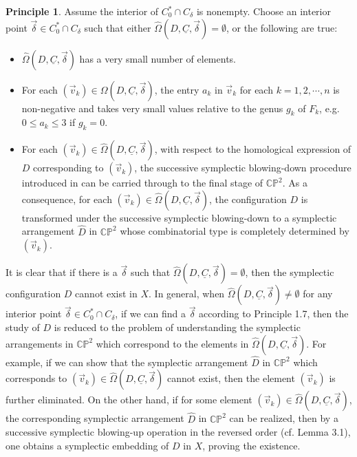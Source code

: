 \documentclass[11pt]{amsart}
\theoremstyle{plain}
\numberwithin{theorem}{section}
\theoremstyle{definition}
\newtheorem{principle}[theorem]{Principle}
\newcommand{\C}{{\mathbb C}}
\renewcommand{\P}{{\mathbb P}}
\begin{document}
\begin{principle}
Assume the interior of $C^\ast_0 \cap C_\delta$ is nonempty. Choose an interior point 
$\vec{\delta}\in C^\ast_0 \cap C_\delta$ such that either $\hat{\Omega}(D,\underline{C},\vec{\delta})=\emptyset$, 
or the following are true:
\begin{itemize}
\item [{(i)}] $\hat{\Omega}(D,\underline{C},\vec{\delta})$ has a very small number of elements.
\item [{(ii)}] For each $(\vec{v}_k)\in\Omega(D,\underline{C},\vec{\delta})$, the entry $a_k$ in $\vec{v}_k$ for each
$k=1,2,\cdots,n$ is non-negative and takes very small values relative to the genus $g_k$ of $F_k$, e.g. $0\leq a_k\leq 3$ if $g_k=0$.
\item [{(iii)}] For each $(\vec{v}_k)\in\hat{\Omega}(D,\underline{C},\vec{\delta})$, with respect to the homological expression of $D$ corresponding to $(\vec{v}_k)$, the successive symplectic blowing-down procedure introduced in \cite{C1} can be carried through to the final stage of $\C\P^2$. As a consequence, for each $(\vec{v}_k)\in\hat{\Omega}(D,\underline{C},\vec{\delta})$, the configuration $D$ is transformed under the successive 
symplectic blowing-down to a symplectic arrangement $\hat{D}$ in $\C\P^2$ whose combinatorial type is 
completely determined by $(\vec{v}_k)$. 
\end{itemize}
\end{principle}

It is clear that if there is a $\vec{\delta}$ such that $\hat{\Omega}(D,\underline{C},\vec{\delta})=\emptyset$, then
the symplectic configuration $D$ cannot exist in $X$. In general, when 
$\hat{\Omega}(D,\underline{C},\vec{\delta})\neq \emptyset$ for any interior point 
$\vec{\delta}\in C^\ast_0 \cap C_\delta$,
if we can find a $\vec{\delta}$ according to Principle 1.7, then the study of $D$ is reduced to the problem of understanding the symplectic arrangements in $\C\P^2$ which correspond to the elements in
$\hat{\Omega}(D,\underline{C},\vec{\delta})$. For example, if we can show that the symplectic arrangement 
$\hat{D}$ in $\C\P^2$ which corresponds to $(\vec{v}_k)\in \hat{\Omega}(D,\underline{C},\vec{\delta})$ 
cannot exist, then the element $(\vec{v}_k)$ is further eliminated. On the other hand, if for some element 
$(\vec{v}_k)\in\hat{\Omega}(D,\underline{C},\vec{\delta})$, the corresponding symplectic arrangement $\hat{D}$ 
in $\C\P^2$ can be realized, then by a successive symplectic blowing-up operation in the reversed order 
(cf. Lemma 3.1), one obtains a symplectic embedding of $D$ in $X$, proving the existence. 
\end{document}
